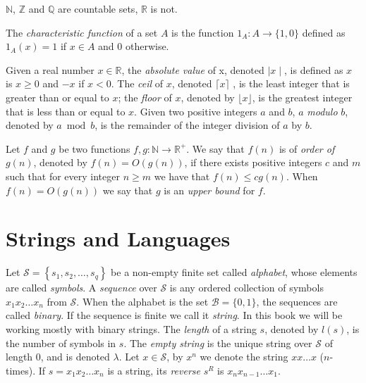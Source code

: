 \begin{example}
$\mathbb{N}$, $\mathbb{Z}$ and $\mathbb{Q}$ are countable sets, $\mathbb{R}$ is not.
\end{example}

The \emph{characteristic function} of a set $A$ is the function $1_A : A \rightarrow \{1, 0\}$ defined as $1_A(x) = 1$ if $x \in A$ and $0$ otherwise.

Given a real number $x \in \mathbb{R}$, the \emph{absolute value} of x, denoted $\mid x \mid$, is defined as $x$ is $x \geq 0$ and $-x$ if $x < 0$. The \emph{ceil} of $x$, denoted $\lceil x \rceil$ , is the least integer that is greater than or equal to $x$; the \emph{floor} of $x$, denoted by $\lfloor x \rfloor$, is the greatest integer that is less than or equal to $x$. Given two positive integers $a$ and $b$, $a$ \emph{modulo} $b$, denoted by $a \bmod b$, is the remainder of the integer division of $a$ by $b$.

Let $f$ and $g$ be two functions $f,g:\mathbb{N}\rightarrow\mathbb{R}^{+}$. We say that $f(n)$ is of \emph{order of} $g(n)$, denoted by $f(n)=O(g(n))$, if there exists positive integers $c$ and $m$ such that for every integer $n \geq m$ we have that $f(n)\leq cg(n)$. When $f(n)=O(g(n))$ we say that $g$ is an \emph{upper bound} for $f$.

%
%

\section{Strings and Languages}
\label{sec:strings}

Let $\mathcal{S}=\left\{ s_{1},s_{2},\ldots,s_{q}\right\}$ be a non-empty finite set called \emph{alphabet}, whose elements are called \emph{symbols}. A \emph{sequence} over $\mathcal{S}$ is any ordered collection of symbols $x_1 x_2 \dots x_n$ from $\mathcal{S}$. When the alphabet is the set $\mathcal{B} = \{0, 1\}$, the sequences are called \emph{binary}. If the sequence is finite we call it \emph{string}. In this book we will be working mostly with binary strings. The \emph{length} of a string $s$, denoted by $l(s)$, is the number of symbols in $s$. The \emph{empty string} is the unique string over $\mathcal{S}$ of length 0, and is denoted $\lambda$. Let $x \in \mathcal{S}$, by $x^n$ we denote the string $x x \ldots x$ ($n$-times). If $s = x_1 x_2 \dots x_n$ is a string, its \emph{reverse} $s^R$ is $x_n x_{n-1} \dots x_1$.

